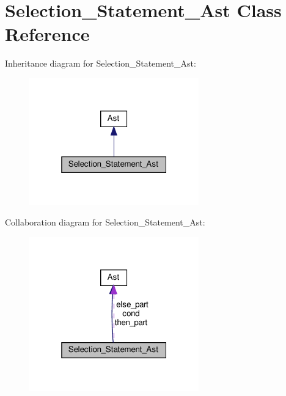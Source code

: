 \hypertarget{classSelection__Statement__Ast}{}\section{Selection\+\_\+\+Statement\+\_\+\+Ast Class Reference}
\label{classSelection__Statement__Ast}


Inheritance diagram for Selection\+\_\+\+Statement\+\_\+\+Ast\+:
\nopagebreak
\begin{figure}[H]
\begin{center}
\leavevmode
\includegraphics[width=208pt]{classSelection__Statement__Ast__inherit__graph}
\end{center}
\end{figure}


Collaboration diagram for Selection\+\_\+\+Statement\+\_\+\+Ast\+:
\nopagebreak
\begin{figure}[H]
\begin{center}
\leavevmode
\includegraphics[width=208pt]{classSelection__Statement__Ast__coll__graph}
\end{center}
\end{figure}
